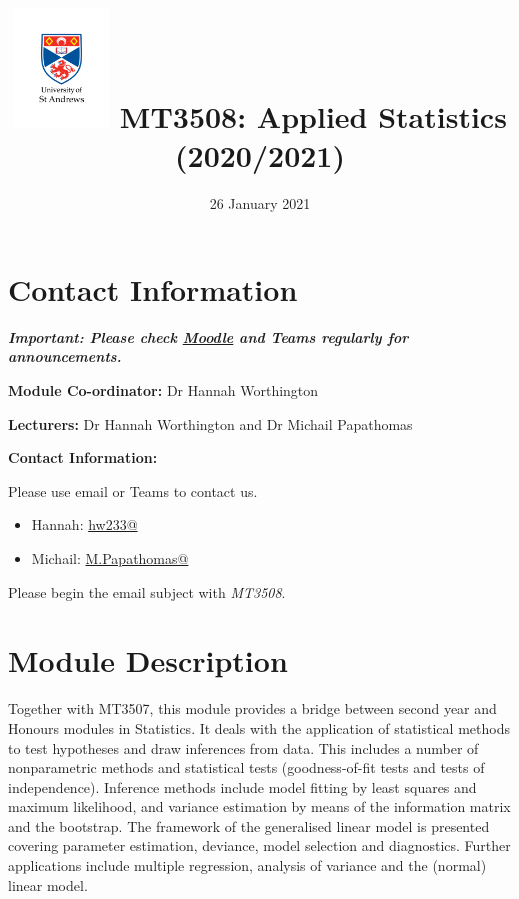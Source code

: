 \documentclass[
  openany]{book}
\title{\includegraphics[width=1in,height=\textheight]{standard-vertical-black.png} MT3508: Applied Statistics (2020/2021)}
\author{}
\date{\vspace{-2.5em}26 January 2021}
\providecommand{\tightlist}{%
  \setlength{\itemsep}{0pt}\setlength{\parskip}{0pt}}
\begin{document}
\maketitle

{
\hypersetup{linkcolor=}
\setcounter{tocdepth}{1}
\tableofcontents
}
\hypertarget{contact-information}{%
\chapter*{Contact Information}\label{contact-information}}

\textbf{\emph{Important: Please check \href{https://moody.st-andrews.ac.uk/moodle/}{Moodle} and Teams regularly for announcements.}}

\textbf{Module Co-ordinator:} Dr Hannah Worthington

\textbf{Lecturers:} Dr Hannah Worthington and Dr Michail Papathomas

\textbf{Contact Information:}

Please use email or Teams to contact us.

\begin{itemize}
\tightlist
\item
  Hannah: \href{mailto:hw233@st-andrews.ac.uk}{hw233@}
\item
  Michail: \href{mailto:M.Papathomas@st-andrews.ac.uk}{M.Papathomas@}
\end{itemize}

Please begin the email subject with \emph{MT3508}.

\hypertarget{module-description}{%
\chapter*{Module Description}\label{module-description}}

Together with MT3507, this module provides a bridge between second year and Honours modules in Statistics. It deals with the application of statistical methods to test hypotheses and draw inferences from data. This includes a number of nonparametric methods and statistical tests (goodness-of-fit tests and tests of independence). Inference methods include model fitting by least squares and maximum likelihood, and variance estimation by means of the information matrix and the bootstrap. The framework of the generalised linear model is presented covering parameter estimation, deviance, model selection and diagnostics. Further applications include multiple regression, analysis of variance and the (normal) linear model.
\end{document}
